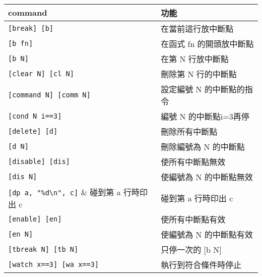 \begin{center}
     \\
    \begin{tabular}{|p{2.7cm}|p{2.7cm}|}
        \hline
        command                         & 功能 \\
        \hline
        \verb|[break] [b]|              & 在當前這行放中斷點 \\
        \verb|[b fn]|                   & 在函式 fn 的開頭放中斷點 \\
        \verb|[b N]|                    & 在第 N 行放中斷點 \\
        \verb|[clear N] [cl N]|         & 刪除第 N 行的中斷點 \\
        \verb|[command N] [comm N]|     & 設定編號 N 的中斷點的指令 \\
        \verb|[cond N i==3]|            & 編號 N 的中斷點i=3再停 \\
        \verb|[delete] [d]|             & 刪除所有中斷點 \\
        \verb|[d N]|                    & 刪除編號為 N 的中斷點 \\
        \verb|[disable] [dis]|          & 使所有中斷點無效 \\
        \verb|[dis N]|                  & 使編號為 N 的中斷點無效 \\
        \verb|[dp a, "%d\n", c]|        & 碰到第 a 行時印出 c \\
        \verb|[enable] [en]|            & 使所有中斷點有效 \\
        \verb|[en N]|                   & 使編號為 N 的中斷點有效 \\
        \verb|[tbreak N] [tb N]|        & 只停一次的 [b N] \\
        \verb|[watch x==3] [wa x==3]|   & 執行到符合條件時停止 \\
        \hline
    \end{tabular} \\
    \hspace{\fill} \\
    \hspace{\fill} \\


\end{center}
